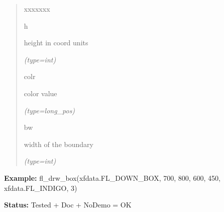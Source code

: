 \begin{boxedminipage}{\funcwidth}
\begin{quote}
\begin{Ventry}{xxxxxxx}
          \item[h]

          height in coord units

            {\it (type=int)}

          \item[colr]

          color value

            {\it (type=long\_pos)}

          \item[bw]

          width of the boundary

            {\it (type=int)}

        \end{Ventry}

      \end{quote}

\textbf{Example:} fl\_drw\_box(xfdata.FL\_DOWN\_BOX, 700, 800, 600, 450, xfdata.FL\_INDIGO, 
3)



\textbf{Status:} Tested + Doc + NoDemo = OK



    \end{boxedminipage}

    \label{xformslib:flbasic:fl_add_symbol}

    \vspace{0.5ex}

